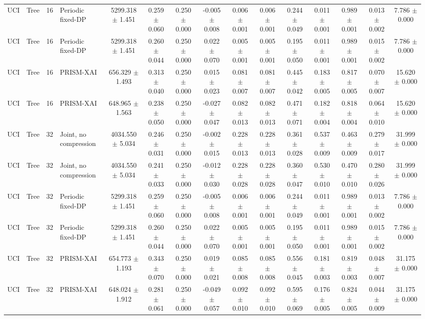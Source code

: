 \begin{tabular}{llllccccccccccc}
UCI & Tree & 16 & Periodic fixed-DP & 5299.318 $\pm$ 1.451 & 0.259 $\pm$ 0.060 & 0.250 $\pm$ 0.000 & -0.005 $\pm$ 0.008 & 0.006 $\pm$ 0.001 & 0.006 $\pm$ 0.001 & 0.244 $\pm$ 0.049 & 0.011 $\pm$ 0.001 & 0.989 $\pm$ 0.001 & 0.013 $\pm$ 0.002 & 7.786 $\pm$ 0.000 \\
UCI & Tree & 16 & Periodic fixed-DP & 5299.318 $\pm$ 1.451 & 0.260 $\pm$ 0.044 & 0.250 $\pm$ 0.000 & 0.022 $\pm$ 0.070 & 0.005 $\pm$ 0.001 & 0.005 $\pm$ 0.001 & 0.195 $\pm$ 0.050 & 0.011 $\pm$ 0.001 & 0.989 $\pm$ 0.001 & 0.015 $\pm$ 0.002 & 7.786 $\pm$ 0.000 \\
UCI & Tree & 16 & PRISM-XAI & 656.329 $\pm$ 1.493 & 0.313 $\pm$ 0.040 & 0.250 $\pm$ 0.000 & 0.015 $\pm$ 0.023 & 0.081 $\pm$ 0.007 & 0.081 $\pm$ 0.007 & 0.445 $\pm$ 0.042 & 0.183 $\pm$ 0.005 & 0.817 $\pm$ 0.005 & 0.070 $\pm$ 0.007 & 15.620 $\pm$ 0.000 \\
UCI & Tree & 16 & PRISM-XAI & 648.965 $\pm$ 1.563 & 0.238 $\pm$ 0.050 & 0.250 $\pm$ 0.000 & -0.027 $\pm$ 0.047 & 0.082 $\pm$ 0.013 & 0.082 $\pm$ 0.013 & 0.471 $\pm$ 0.071 & 0.182 $\pm$ 0.004 & 0.818 $\pm$ 0.004 & 0.064 $\pm$ 0.010 & 15.620 $\pm$ 0.000 \\
UCI & Tree & 32 & Joint, no compression & 4034.550 $\pm$ 5.034 & 0.246 $\pm$ 0.031 & 0.250 $\pm$ 0.000 & -0.002 $\pm$ 0.015 & 0.228 $\pm$ 0.013 & 0.228 $\pm$ 0.013 & 0.361 $\pm$ 0.028 & 0.537 $\pm$ 0.009 & 0.463 $\pm$ 0.009 & 0.279 $\pm$ 0.017 & 31.999 $\pm$ 0.000 \\
UCI & Tree & 32 & Joint, no compression & 4034.550 $\pm$ 5.034 & 0.241 $\pm$ 0.033 & 0.250 $\pm$ 0.000 & -0.012 $\pm$ 0.030 & 0.228 $\pm$ 0.028 & 0.228 $\pm$ 0.028 & 0.360 $\pm$ 0.047 & 0.530 $\pm$ 0.010 & 0.470 $\pm$ 0.010 & 0.280 $\pm$ 0.026 & 31.999 $\pm$ 0.000 \\
UCI & Tree & 32 & Periodic fixed-DP & 5299.318 $\pm$ 1.451 & 0.259 $\pm$ 0.060 & 0.250 $\pm$ 0.000 & -0.005 $\pm$ 0.008 & 0.006 $\pm$ 0.001 & 0.006 $\pm$ 0.001 & 0.244 $\pm$ 0.049 & 0.011 $\pm$ 0.001 & 0.989 $\pm$ 0.001 & 0.013 $\pm$ 0.002 & 7.786 $\pm$ 0.000 \\
UCI & Tree & 32 & Periodic fixed-DP & 5299.318 $\pm$ 1.451 & 0.260 $\pm$ 0.044 & 0.250 $\pm$ 0.000 & 0.022 $\pm$ 0.070 & 0.005 $\pm$ 0.001 & 0.005 $\pm$ 0.001 & 0.195 $\pm$ 0.050 & 0.011 $\pm$ 0.001 & 0.989 $\pm$ 0.001 & 0.015 $\pm$ 0.002 & 7.786 $\pm$ 0.000 \\
UCI & Tree & 32 & PRISM-XAI & 654.773 $\pm$ 1.193 & 0.343 $\pm$ 0.070 & 0.250 $\pm$ 0.000 & 0.019 $\pm$ 0.021 & 0.085 $\pm$ 0.008 & 0.085 $\pm$ 0.008 & 0.556 $\pm$ 0.045 & 0.181 $\pm$ 0.003 & 0.819 $\pm$ 0.003 & 0.048 $\pm$ 0.007 & 31.175 $\pm$ 0.000 \\
UCI & Tree & 32 & PRISM-XAI & 648.024 $\pm$ 1.912 & 0.281 $\pm$ 0.061 & 0.250 $\pm$ 0.000 & -0.049 $\pm$ 0.057 & 0.092 $\pm$ 0.010 & 0.092 $\pm$ 0.010 & 0.595 $\pm$ 0.069 & 0.176 $\pm$ 0.005 & 0.824 $\pm$ 0.005 & 0.044 $\pm$ 0.009 & 31.175 $\pm$ 0.000 \\
\bottomrule
\end{tabular}
